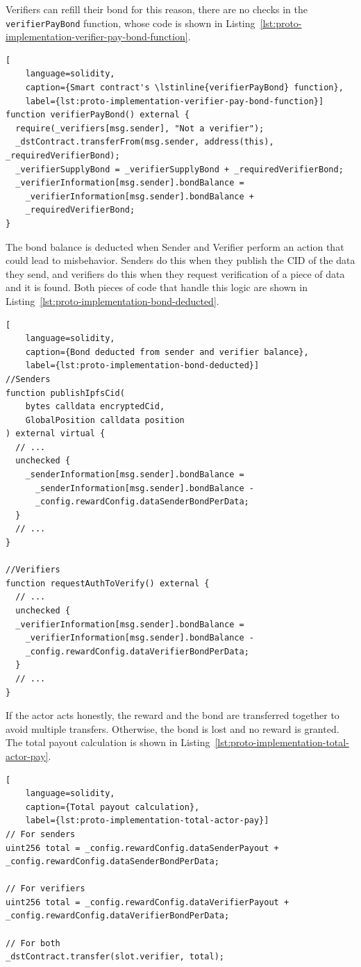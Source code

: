 Verifiers can refill their bond for this reason, there are no checks in the \lstinline{verifierPayBond} function, whose code is shown in Listing~\ref{lst:proto-implementation-verifier-pay-bond-function}.

\begin{lstlisting}[
    language=solidity,
    caption={Smart contract's \lstinline{verifierPayBond} function},
    label={lst:proto-implementation-verifier-pay-bond-function}]
function verifierPayBond() external {
  require(_verifiers[msg.sender], "Not a verifier");
  _dstContract.transferFrom(msg.sender, address(this), _requiredVerifierBond);
  _verifierSupplyBond = _verifierSupplyBond + _requiredVerifierBond;
  _verifierInformation[msg.sender].bondBalance =
    _verifierInformation[msg.sender].bondBalance +
    _requiredVerifierBond;
}
\end{lstlisting}

The bond balance is deducted when Sender and Verifier perform an action that could lead to misbehavior.
Senders do this when they publish the CID of the data they send, and verifiers do this when they request verification of a piece of data and it is found.
Both pieces of code that handle this logic are shown in Listing~\ref{lst:proto-implementation-bond-deducted}.

\begin{lstlisting}[
    language=solidity,
    caption={Bond deducted from sender and verifier balance},
    label={lst:proto-implementation-bond-deducted}]
//Senders
function publishIpfsCid(
    bytes calldata encryptedCid,
    GlobalPosition calldata position
) external virtual {
  // ...
  unchecked {
    _senderInformation[msg.sender].bondBalance =
      _senderInformation[msg.sender].bondBalance -
      _config.rewardConfig.dataSenderBondPerData;
  }
  // ...
}

//Verifiers
function requestAuthToVerify() external {
  // ...
  unchecked {
  _verifierInformation[msg.sender].bondBalance =
    _verifierInformation[msg.sender].bondBalance -
    _config.rewardConfig.dataVerifierBondPerData;
  }
  // ...
}
\end{lstlisting}

If the actor acts honestly, the reward and the bond are transferred together to avoid multiple transfers.
Otherwise, the bond is lost and no reward is granted.
The total payout calculation is shown in Listing~\ref{lst:proto-implementation-total-actor-pay}.

\begin{lstlisting}[
    language=solidity,
    caption={Total payout calculation},
    label={lst:proto-implementation-total-actor-pay}]
// For senders
uint256 total = _config.rewardConfig.dataSenderPayout + _config.rewardConfig.dataSenderBondPerData;

// For verifiers
uint256 total = _config.rewardConfig.dataVerifierPayout + _config.rewardConfig.dataVerifierBondPerData;

// For both
_dstContract.transfer(slot.verifier, total);
\end{lstlisting}

